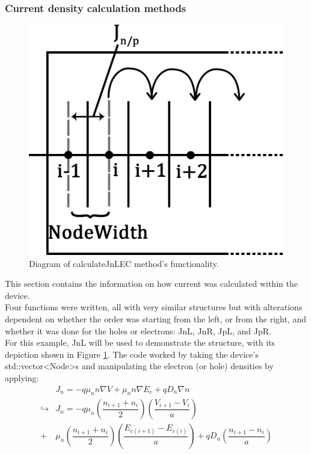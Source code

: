 \documentclass[titlepage]{article}
\begin{document}
\subsubsection{Current density calculation methods}
\begin{figure}
	\centering
	\includegraphics[scale=0.2]{Figures/JnL}
	\caption{\label{fig:Mic:JnL} Diagram of calculateJnLEC method's functionality.}
\end{figure}
This section contains the information on how current was calculated within the device.\\ Four functions were written, all with very similar structures but with alterations dependent on whether the order was starting from the left, or from the right, and whether it was done for the holes or electrons: JnL, JnR, JpL, and JpR. \\
For this example, JnL will be used to demonstrate the structure, with its depiction shown in Figure \ref{fig:Mic:JnL}.
The code worked by taking the device's std::vector<Node>s and manipulating the electron (or hole) densities by applying:
\begin{eqnarray}
	&J_n = -q\mu_n n\nabla V + \mu_n n \nabla E_c + q D_n \nabla n\\
		\hookrightarrow &J_n = -q\mu_n(\dfrac{n_{i+1}+n_{i}}{2})(\dfrac{V_{i+1}-V_{i}}{a})\\
	+& \mu_n (\dfrac{n_{i+1}+n_{i}}{2})(\dfrac{E_{c(i+1)}-E_{c(i)}}{a}) + qD_n(\dfrac{n_{i+1}-n_{i}}{a}) \\
\end{eqnarray}
\end{document}
